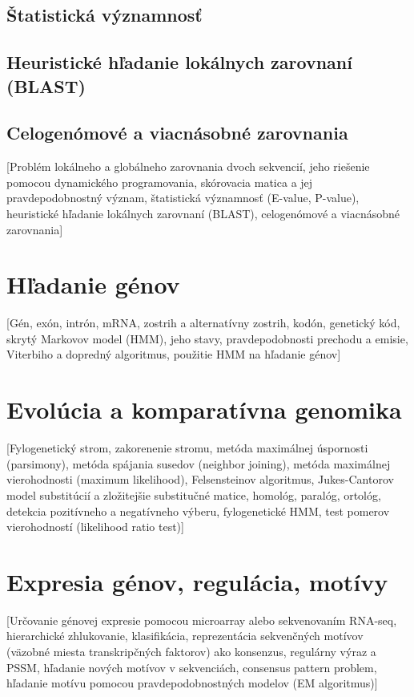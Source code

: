 		\subsection{Štatistická významnosť}

		\subsection{Heuristické hľadanie lokálnych zarovnaní (BLAST)}

		\subsection{Celogenómové a viacnásobné zarovnania}

	[Problém lokálneho a globálneho zarovnania dvoch sekvencií, jeho riešenie pomocou dynamického programovania, skórovacia matica a jej pravdepodobnostný význam, štatistická významnosť (E-value, P-value), heuristické hľadanie lokálnych zarovnaní (BLAST), celogenómové a viacnásobné zarovnania]

	\section{Hľadanie génov}

	[Gén, exón, intrón, mRNA, zostrih a alternatívny zostrih, kodón, genetický kód, skrytý Markovov model (HMM), jeho stavy, pravdepodobnosti prechodu a emisie, Viterbiho a dopredný algoritmus, použitie HMM na hľadanie génov]

	\section{Evolúcia a komparatívna genomika}

	[Fylogenetický strom, zakorenenie stromu, metóda maximálnej úspornosti (parsimony), metóda spájania susedov (neighbor joining), metóda maximálnej vierohodnosti (maximum likelihood), Felsensteinov algoritmus, Jukes-Cantorov model substitúcií a zložitejšie substitučné matice, homológ, paralóg, ortológ, detekcia pozitívneho a negatívneho výberu, fylogenetické HMM, test pomerov vierohodností (likelihood ratio test)]

	\section{Expresia génov, regulácia, motívy}

	[Určovanie génovej expresie pomocou microarray alebo sekvenovaním RNA-seq, hierarchické zhlukovanie, klasifikácia, reprezentácia sekvenčných motívov (väzobné miesta transkripčných faktorov) ako konsenzus, regulárny výraz a PSSM, hľadanie nových motívov v sekvenciách, consensus pattern problem, hľadanie motívu pomocou pravdepodobnostných modelov (EM algoritmus)]

